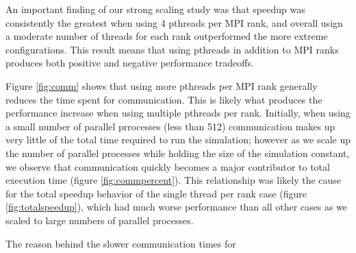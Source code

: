 An important finding of our strong scaling study was that speedup was consistently
the greatest when using 4 pthreads per MPI rank, and overall usign a moderate number of
threads for each rank outperformed the more extreme configurations. This result
means that using pthreads in addition to MPI ranks produces both positive and
negative performance tradeoffs.

Figure \ref{fig:comm} shows that using more pthreads per MPI rank generally
reduces the time spent for communication. This is likely what produces the performance
increase when using multiple pthreads per rank. Initially, when using a small
number of parallel prrocesses (less than 512) communication makes up very little
of the total time required to run the simulation; however as we scale up the
number of parallel processes while holding the size of the simulation constant,
we observe that communication quickly becomes a major contributor to total
execution time (figure \ref{fig:commpercent}). This relationship was likely the
cause for the total speedup behavior of the single thread per rank case (figure
\ref{fig:totalspeedup}), which had much worse performance than all other cases as we
scaled to large numbers of parallel processes.

The reason behind the slower communication times for 
